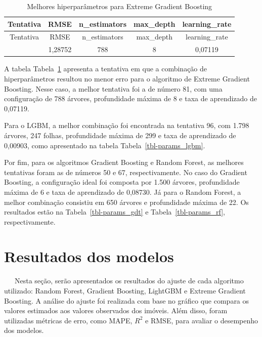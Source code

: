 \documentclass[
  12pt,
  a4paper,
]{scrreprt}
\begin{document}
\begin{longtable}[]{@{}ccccc@{}}
\caption{Melhores hiperparâmetros para Extreme Gradient
Boosting}\label{tbl-params_xgb}\tabularnewline
\toprule\noalign{}
Tentativa & RMSE & n\_estimators & max\_depth & learning\_rate \\
\midrule\noalign{}
\endfirsthead
\toprule\noalign{}
Tentativa & RMSE & n\_estimators & max\_depth & learning\_rate \\
\midrule\noalign{}
\endhead
\bottomrule\noalign{}
\endlastfoot
81 & 1,28752 & 788 & 8 & 0,07119 \\
\end{longtable}

A tabela Tabela~\ref{tbl-params_xgb} apresenta a tentativa em que a
combinação de hiperparâmetros resultou no menor erro para o algoritmo de
Extreme Gradient Boosting. Nesse caso, a melhor tentativa foi a de
número 81, com uma configuração de 788 árvores, profundidade máxima de 8
e taxa de aprendizado de 0,07119.

\vspace{12pt}

Para o LGBM, a melhor combinação foi encontrada na tentativa 96, com
1.798 árvores, 247 folhas, profundidade máxima de 299 e taxa de
aprendizado de 0,00903, como apresentado na tabela
Tabela~\ref{tbl-params_lgbm}.

\vspace{12pt}

Por fim, para os algoritmos Gradient Boosting e Random Forest, as
melhores tentativas foram as de números 50 e 67, respectivamente. No
caso do Gradient Boosting, a configuração ideal foi composta por 1.500
árvores, profundidade máxima de 6 e taxa de aprendizado de 0,08730. Já
para o Random Forest, a melhor combinação consistiu em 650 árvores e
profundidade máxima de 22. Os resultados estão na
Tabela~\ref{tbl-params_gdt} e Tabela~\ref{tbl-params_rf},
respectivamente.

\section{Resultados dos modelos}\label{resultados-dos-modelos}

~~~Nesta seção, serão apresentados os resultados do ajuste de cada
algoritmo utilizado: Random Forest, Gradient Boosting, LightGBM e
Extreme Gradient Boosting. A análise do ajuste foi realizada com base no
gráfico que compara os valores estimados aos valores observados dos
imóveis. Além disso, foram utilizadas métricas de erro, como MAPE,
\(R^2\) e RMSE, para avaliar o desempenho dos modelos.
\end{document}
